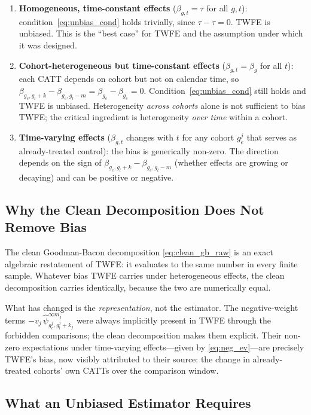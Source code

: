\documentclass[12pt,letterpaper]{article}
\theoremstyle{remark}
\theoremstyle{definition}
\newcommand{\hpsi}{\hat{\psi}}     %
\begin{document}
\begin{enumerate}
  \item \textbf{Homogeneous, time-constant effects} ($\beta_{g,t}=\tau$ for all
    $g,t$): condition~\eqref{eq:unbias_cond} holds trivially, since
    $\tau - \tau = 0$. TWFE is unbiased. This is the ``best case'' for TWFE and
    the assumption under which it was designed.

  \item \textbf{Cohort-heterogeneous but time-constant effects}
    ($\beta_{g,t}=\beta_g$ for all $t$): each CATT depends on cohort but not
    on calendar time, so $\beta_{g_e,g_l+k} - \beta_{g_e,g_l-m} = \beta_{g_e}
    - \beta_{g_e} = 0$. Condition~\eqref{eq:unbias_cond} still holds and TWFE
    is unbiased. Heterogeneity \emph{across cohorts} alone is not sufficient to
    bias TWFE; the critical ingredient is heterogeneity \emph{over time} within
    a cohort.

  \item \textbf{Time-varying effects} ($\beta_{g,t}$ changes with $t$ for any
    cohort $g_e^j$ that serves as already-treated control): the bias is
    generically non-zero. The direction depends on the sign of
    $\beta_{g_e,g_l+k} - \beta_{g_e,g_l-m}$ (whether effects are growing or
    decaying) and can be positive or negative.
\end{enumerate}

\subsection{Why the Clean Decomposition Does Not Remove Bias}

The clean Goodman-Bacon decomposition \eqref{eq:clean_gb_raw} is an exact
algebraic restatement of TWFE: it evaluates to the same number in every finite
sample. Whatever bias TWFE carries under heterogeneous effects, the clean
decomposition carries identically, because the two are numerically equal.

What has changed is the \emph{representation}, not the estimator. The
negative-weight terms $-v_j\,\hpsi^{\infty m_j}_{g_e^j, g_l^j+k_j}$ were
always implicitly present in TWFE through the forbidden comparisons; the clean
decomposition makes them explicit. Their non-zero expectations under
time-varying effects---given by \eqref{eq:neg_ev}---are precisely TWFE's bias,
now visibly attributed to their source: the change in already-treated cohorts'
own CATTs over the comparison window.

\subsection{What an Unbiased Estimator Requires}
\end{document}

